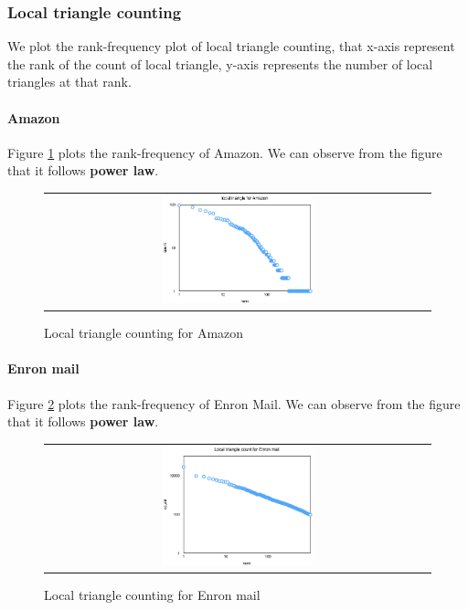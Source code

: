 \subsubsection{Local triangle counting}
We plot the rank-frequency plot of local triangle counting, that x-axis represent the rank of the count of local triangle, y-axis represents the number of local triangles at that rank. 

\paragraph{Amazon}
Figure \ref{t7:amazon} plots the rank-frequency of Amazon. We can observe from the figure that it follows {\bf power law}. 
\begin{figure}[!htbf]
\begin{center}
\begin{tabular}{c}
     \includegraphics[width=0.4\textwidth]{FIG/t7_amazon.png}
\end{tabular}
\caption{Local triangle counting for Amazon}
\label{t7:amazon}
\end{center}
\end{figure}

\paragraph{Enron mail}
Figure \ref{t7:enron} plots the rank-frequency of Enron Mail. We can observe from the figure that it follows {\bf power law}. 
\begin{figure}[!htbf]
\begin{center}
\begin{tabular}{c}
     \includegraphics[width=0.4\textwidth]{FIG/t7_enron.png}
\end{tabular}
\caption{Local triangle counting for Enron mail}
\label{t7:enron}
\end{center}
\end{figure}

